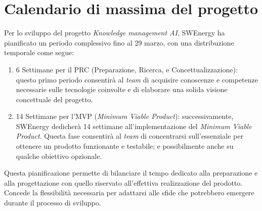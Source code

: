\section{Calendario di massima del progetto}

Per lo sviluppo del progetto \textit{Knowledge management AI}, SWEnergy ha 
pianificato un periodo complessivo fino al 29 marzo, con una distribuzione 
temporale come segue:

\begin{enumerate}
	\item 6 Settimane per il PRC (Preparazione, Ricerca, e Concettualizzazione): 
	questo primo periodo consentirà al \textit{team} di acquisire conoscenze e 
	competenze necessarie sulle tecnologie coinvolte e di elaborare una solida 
	visione concettuale del progetto.

	\item 14 Settimane per l'MVP (\textit{Minimum Viable Product}): 
	successivamente, SWEnergy dedicherà 14 settimane all'implementazione del
	\textit{Minimum Viable Product}. Questa fase consentirà al \textit{team} di 
	concentrarsi sull'essenziale per ottenere un prodotto funzionante e 
	testabile; e possibilmente anche su qualche obiettivo opzionale.
\end{enumerate}

Questa pianificazione permette di bilanciare il tempo dedicato alla 
preparazione e alla progettazione con quello riservato all'effettiva 
realizzazione del prodotto. Concede la flessibilità necessaria per adattarsi 
alle sfide che potrebbero emergere durante il processo di sviluppo.

